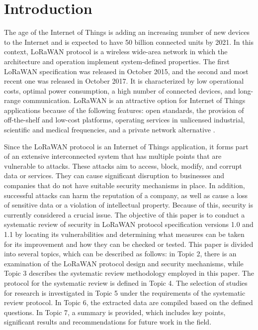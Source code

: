 \documentclass[manuscript,screen,review=false]{acmart}
\begin{document}



\maketitle

\section{Introduction}
The age of the Internet of Things is adding an increasing number of new devices to the Internet and is expected to have 50 billion connected units by 2021. In this context, LoRaWAN protocol is a wireless wide-area network in which the architecture and operation implement system-defined properties. The first LoRaWAN specification was released in October 2015, and the second and most recent one was released in October 2017. It is characterized by low operational costs, optimal power consumption, a high number of connected devices, and long-range communication. LoRaWAN is an attractive option for Internet of Things applications because of the following features: open standards, the provision of off-the-shelf and low-cost platforms, operating services in unlicensed industrial, scientific and medical frequencies, and a private network alternative \cite{comparative_LPWAN}. 

Since the LoRaWAN protocol is an Internet of Things application, it forms part of an extensive interconnected system that has multiple points that are vulnerable to attacks. These attacks aim to access, block, modify, and corrupt data or services. They can cause significant disruption to businesses and companies that do not have suitable security mechanisms in place. In addition, successful attacks can harm the reputation of a company, as well as cause a loss of sensitive data or a violation of intellectual property. Because of this, security is currently considered a crucial issue. The objective of this paper is to conduct a systematic review of security in LoRaWAN protocol specification versions 1.0 and 1.1 by locating its vulnerabilities and determining what measures can be taken for its improvement and how they can be checked or tested. This paper is divided into several topics, which can be described as follows: in Topic 2, there is an examination of the LoRaWAN protocol design and security mechanisms, while Topic 3 describes the systematic review methodology employed in this paper. The protocol for the systematic review is defined in Topic 4. The selection of studies for research is investigated in Topic 5 under the requirements of the systematic review protocol. In Topic 6, the extracted data are compiled based on the defined questions. In Topic 7, a summary is provided, which includes key points, significant results and recommendations for future work in the field.
\end{document}
